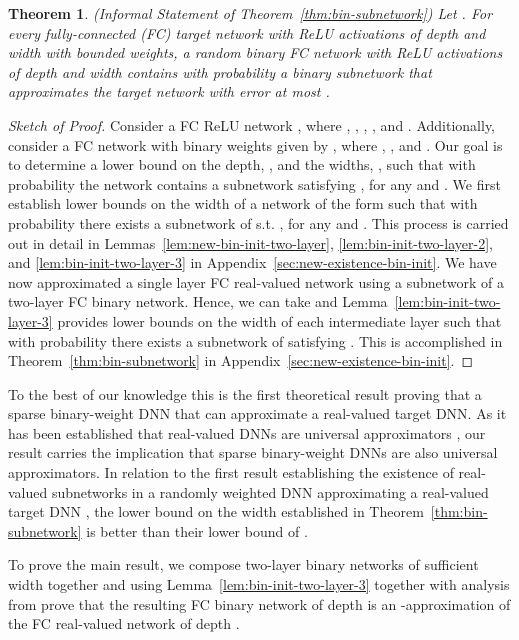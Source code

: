 \documentclass{article} \usepackage{iclr2021_conference,times}
\newtheorem{theorem}{Theorem}
\begin{document}
\begin{theorem}(Informal Statement of Theorem~\ref{thm:bin-subnetwork}) \label{thm:informal-binary-weight-subnetwork}
Let . For every fully-connected (FC) target network with ReLU activations of depth  and width  with bounded weights, a random binary FC network with ReLU activations of depth  and width  contains with probability  a binary subnetwork that approximates the target network with error at most .
\end{theorem}

\begin{proof}[Sketch of Proof]
Consider a FC ReLU network , where , , , , and . Additionally, consider a FC network with binary weights given by 
, where , , and . Our goal is to determine a lower bound on the depth, , and the widths, , such that with probability  the network  contains a subnetwork  satisfying , for any  and .
We first establish lower bounds on the width of a network of the form  such that with probability  there exists a subnetwork  of  s.t. , for any  and . This process is carried out in detail in Lemmas~\ref{lem:new-bin-init-two-layer}, \ref{lem:bin-init-two-layer-2}, and \ref{lem:bin-init-two-layer-3} in Appendix~\ref{sec:new-existence-bin-init}. We have now approximated a single layer FC real-valued network using a subnetwork of a two-layer FC binary network. Hence, we can take  and Lemma~\ref{lem:bin-init-two-layer-3} provides lower bounds on the width of each intermediate layer such that with probability  there exists a subnetwork  of  satisfying . This is accomplished in Theorem~\ref{thm:bin-subnetwork} in Appendix~\ref{sec:new-existence-bin-init}.
\end{proof}

To the best of our knowledge this is the first theoretical result proving that a sparse binary-weight DNN that can approximate a real-valued target DNN. As it has been established that real-valued DNNs are universal approximators \citep{scarselli1998universal}, our result carries the implication that sparse binary-weight DNNs are also universal approximators. In relation to the first result establishing the existence of real-valued subnetworks in a randomly weighted DNN approximating a real-valued target DNN \citep{malach2020proving}, the lower bound on the width established in Theorem~\ref{thm:bin-subnetwork} is better than their lower bound of . 

\iffalse
To prove the main result, we compose two-layer binary networks of sufficient width together and using Lemma~\ref{lem:bin-init-two-layer-3} together with analysis from \cite{malach2020proving} prove that the resulting FC binary network of depth  is an -approximation of the FC real-valued network of depth .
\end{document}
